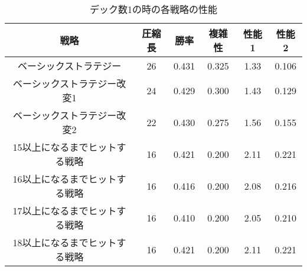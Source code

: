 
\begin{table}[H]
\caption{デック数1の時の各戦略の性能}
\label{table:data_type4}
\begin{center}
\begin{tabular}{|c|c|c|c|c|c|}
\hline
戦略           & 圧縮長 & 勝率    & 複雑性   & 性能1  & 性能2   \\ \hline
ベーシックストラテジー         & 26  & 0.431 & 0.325 & 1.33 & 0.106 \\ \hline
ベーシックストラテジー改変1      & 24  & 0.429 & 0.300  & 1.43 & 0.129 \\ \hline
ベーシックストラテジー改変2      & 22  & 0.430 & 0.275 & 1.56 & 0.155 \\ \hline
15以上になるまでヒットする戦略 & 16  & 0.421 & 0.200 & 2.11 & 0.221 \\ \hline
16以上になるまでヒットする戦略 & 16  & 0.416 & 0.200 & 2.08 & 0.216 \\ \hline
17以上になるまでヒットする戦略 & 16  & 0.410 & 0.200 & 2.05 & 0.210 \\ \hline
18以上になるまでヒットする戦略 & 16  & 0.421 & 0.200 & 2.11 & 0.221 \\ \hline
\end{tabular}
\end{center}
\end{table}


